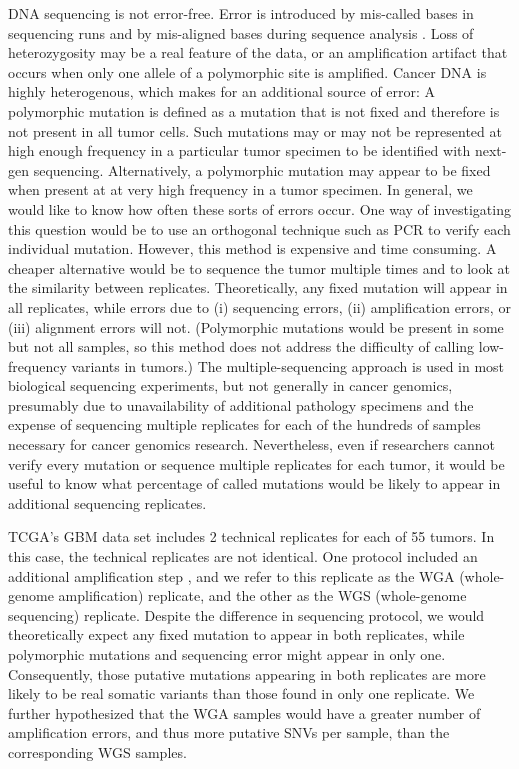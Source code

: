 \documentclass[11 pt]{article} %
\begin{document}
DNA sequencing is not error-free. Error is introduced by mis-called bases in sequencing runs and by mis-aligned bases during sequence analysis \citep{seqerror}. Loss of heterozygosity may be a real feature of the data, or an amplification artifact that occurs when only one allele of a polymorphic site is amplified. Cancer DNA is highly heterogenous, which makes for an additional source of error: A polymorphic mutation is defined as a mutation that is not fixed and therefore is not present in all tumor cells. Such mutations may or may not be represented at high enough frequency in a particular tumor specimen to be identified with next-gen sequencing. Alternatively, a polymorphic mutation may appear to be fixed when present at at very high frequency in a tumor specimen. In general, we would like to know how often these sorts of errors occur. One way of investigating this question would be to use an orthogonal technique such as PCR to verify each individual mutation. However, this method is expensive and time consuming. A cheaper alternative would be to sequence the tumor multiple times and to look at the similarity between replicates. Theoretically, any fixed mutation will appear in all replicates, while errors due to (i) sequencing errors, (ii) amplification errors, or (iii) alignment errors will not. (Polymorphic mutations would be present in some but not all samples, so this method does not address the difficulty of calling low-frequency variants in tumors.) The multiple-sequencing approach is used in most biological sequencing experiments, but not generally in cancer genomics, presumably due to unavailability of additional pathology specimens and the expense of sequencing multiple replicates for each of the hundreds of samples necessary for cancer genomics research. Nevertheless, even if researchers cannot verify every mutation or sequence multiple replicates for each tumor, it would be useful to know what percentage of called mutations would be likely to appear in additional sequencing replicates.

TCGA's GBM data set includes 2 technical replicates for each of 55 tumors. In this case, the technical replicates are not identical. One protocol included an additional amplification step \citep{TCGA-GBM}, and we refer to this replicate as the WGA (whole-genome amplification) replicate, and the other as the WGS (whole-genome sequencing) replicate. Despite the difference in sequencing protocol, we would theoretically expect any fixed mutation to appear in both replicates, while polymorphic mutations and sequencing error might appear in only one. Consequently, those putative mutations appearing in both replicates are more likely to be real somatic variants than those found in only one replicate. We further hypothesized that the WGA samples would have a greater number of amplification errors, and thus more putative SNVs per sample, than the corresponding WGS samples. 
\end{document}
